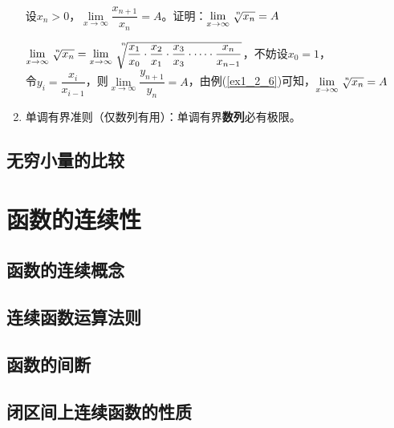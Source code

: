 \documentclass[11pt,fleqn]{book} %
\begin{document}
\begin{enumerate}
\begin{prove}
\end{prove}
\begin{example}
设$x_n>0$，$\lim\limits_{x \rightarrow \infty} \dfrac{x_{n+1}}{x_n} = A$。证明：$\lim\limits_{x \rightarrow \infty} \sqrt[\leftroot{-2}\uproot{4}n]{x_n} = A$
\end{example}
\begin{prove}
$\lim\limits_{x \rightarrow \infty} \sqrt[\leftroot{-2}\uproot{4}n]{x_n} = \lim\limits_{x \rightarrow \infty} \sqrt[\leftroot{-6}\uproot{16}n]{\dfrac{x_1}{x_0} \cdot \dfrac{x_2}{x_1} \cdot \dfrac{x_3}{x_3} \cdot \cdots \cdot \dfrac{x_n}{x_{n-1}}}$，不妨设$x_0 = 1$，\\
令$y_i = \dfrac{x_{i}}{x_{i-1}}$，则$\lim\limits_{x \rightarrow \infty} \dfrac{y_{n+1}}{y_n} = A$，由例(\ref{ex1_2_6})可知，$\lim\limits_{x \rightarrow \infty} \sqrt[\leftroot{-2}\uproot{4}n]{x_n} = A$
\end{prove}
\newpage
\item 单调有界准则（仅数列有用）：单调有界\textbf{数列}必有极限。
\end{enumerate}
\subsection{无穷小量的比较}
\section{函数的连续性}
\subsection{函数的连续概念}
\subsection{连续函数运算法则}
\subsection{函数的间断}
\subsection{闭区间上连续函数的性质}








\begin{appendices}

\end{appendices}
\end{document}
